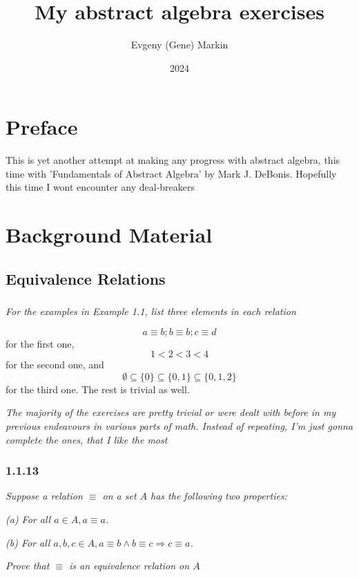 \documentclass[11pt,oneside,titlepage]{book}
\title{My abstract algebra exercises}
\author{Evgeny (Gene) Markin}
\date{2024}
\DeclareMathOperator \ra {\Rightarrow}
\newcommand{\set}[1]{\{ #1 \}}
\begin{document}
\maketitle
\tableofcontents

\chapter*{Preface}

This is yet another attempt at making any progress with abstract
algebra, this time with 'Fundamentals of Abstract Algebra' by Mark
J. DeBonis. Hopefully this time I wont encounter any deal-breakers

\chapter{Background Material}

\section{Equivalence Relations}

\subsection{}

\textit{For the examples in Example 1.1, list three elements in each relation}

$$ a \equiv b; b \equiv b; c \equiv d$$
for the first one,
$$ 1 < 2 < 3 < 4$$
for the second one, and
$$\emptyset \subseteq \set{0} \subseteq \set{0, 1} \subseteq \set{0, 1, 2}$$
for the third one. The rest is trivial as well.

\textit{The majority of the exercises are pretty trivial or were dealt
with before in my previous endeavours in various parts of
math. Instead of repeating, I'm just gonna complete the ones, that I
like the most}

\subsection*{1.1.13}

\textit{Suppose a relation $\equiv$ on a set $A$ has the following two
properties:}

\textit{(a) For all $a \in A, a \equiv a$.}

\textit{(b) For all $a, b, c \in A, a \equiv b \land b \equiv c \ra c
\equiv a$.}

\textit{Prove that $\equiv$ is an equivalence relation on $A$}
\end{document}
